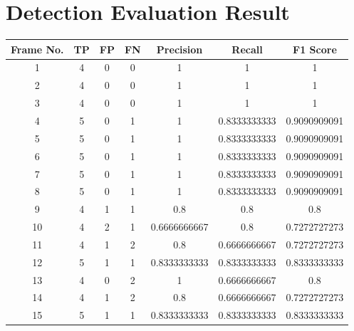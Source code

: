         \section{Detection Evaluation Result}
        \begin{table}[h]
                \begin{tabular}{|c|c|c|c|c|c|c|}
                       \hline 
                       \textbf{Frame No.} & \textbf{TP} & \textbf{FP} & \textbf{FN} & \textbf{Precision} & \textbf{Recall} & \textbf{F1 Score} \\ 
                       \hline
                        1 & 4 & 0 & 0 & 1 & 1 & 1 \\ 
                       \hline
                        2 & 4 & 0 & 0 & 1 & 1 & 1 \\ 
                       \hline
                        3 & 4 & 0 & 0 & 1 & 1 & 1 \\ 
                       \hline
                        4 & 5 & 0 & 1 & 1 & 0.8333333333 & 0.9090909091 \\ 
                       \hline
                        5 & 5 & 0 & 1 & 1 & 0.8333333333 & 0.9090909091 \\ 
                       \hline
                        6 & 5 & 0 & 1 & 1 & 0.8333333333 & 0.9090909091 \\ 
                       \hline
                        7 & 5 & 0 & 1 & 1 & 0.8333333333 & 0.9090909091 \\ 
                       \hline
                        8 & 5 & 0 & 1 & 1 & 0.8333333333 & 0.9090909091 \\ 
                       \hline
                        9 & 4 & 1 & 1 & 0.8 & 0.8 & 0.8 \\ 
                       \hline
                        10 & 4 & 2 & 1 & 0.6666666667 & 0.8 & 0.7272727273 \\ 
                       \hline
                        11 & 4 & 1 & 2 & 0.8 & 0.6666666667 & 0.7272727273 \\ 
                       \hline
                        12 & 5 & 1 & 1 & 0.8333333333 & 0.8333333333 & 0.8333333333 \\ 
                       \hline
                        13 & 4 & 0 & 2 & 1 & 0.6666666667 & 0.8 \\ 
                       \hline
                        14 & 4 & 1 & 2 & 0.8 & 0.6666666667 & 0.7272727273 \\ 
                       \hline
                        15 & 5 & 1 & 1 & 0.8333333333 & 0.8333333333 & 0.8333333333 \\ 

\end{tabular}
\end{table}
